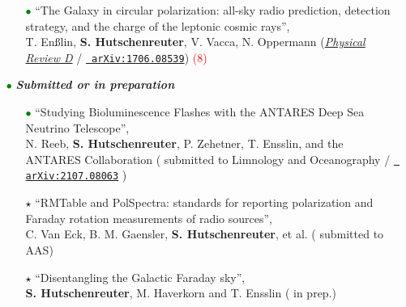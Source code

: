 \begin{itemize}
\begin{itemize}
        \vspace{6pt}

        \item[\textcolor{Green}{$\bullet$}]{``The Galaxy in circular polarization: all-sky radio prediction, detection strategy, and the charge of the leptonic cosmic rays'', \\ T. En{\ss}lin,  \textbf{S. Hutschenreuter}, V. Vacca, N. Oppermann   (\href{https://journals.aps.org/prd/abstract/10.1103/PhysRevD.96.043021}{\color{blue}\textit{Physical Review D}} / \href{https://arxiv.org/abs/1706.08539}{\texttt{{\color{blue} arXiv:1706.08539}}})
        \textcolor{red}{(8)}
        }
      \end{itemize}


  \vspace{10pt}
  \item[\textcolor{Green}{$\bullet$}] \textit{\textbf{Submitted or in preparation}}
  \vspace{10pt}

  \begin{itemize}

    \item[\textcolor{Green}{$\bullet$}]{``Studying Bioluminescence Flashes with the ANTARES Deep Sea Neutrino Telescope'', \\
    N. Reeb, \textbf{S. Hutschenreuter}, P. Zehetner, T. Ensslin, and the ANTARES Collaboration ({\color{blue} submitted to Limnology and Oceanography / \href{https://arxiv.org/abs/2107.08063}{\texttt{{\color{blue} arXiv:2107.08063}}}} })

    \vspace{6pt}

    \item[\textcolor{Black}{$\star$}]{``RMTable and PolSpectra: standards for reporting polarization and Faraday rotation measurements of radio sources'', \\
    C. Van Eck, B. M. Gaensler, \textbf{S. Hutschenreuter}, et al. ({\color{blue}  submitted to AAS}})

    \vspace{6pt}

    \item[\textcolor{Black}{$\star$}]{``Disentangling the Galactic Faraday sky'', \\
     \textbf{S. Hutschenreuter}, M. Haverkorn and  T. Ensslin ({\color{blue}  in prep.}})
  \end{itemize}

\end{itemize}
